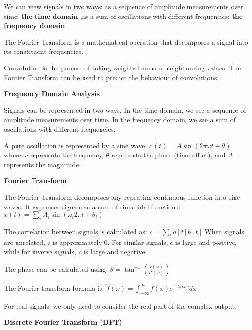 \documentclass{article}
\begin{document}
\noindent We can view signals in two ways: as a sequence of amplitude measurements over time: \textbf{the time domain}
,as a sum of oscillations with different frequencies: \textbf{the frequency domain}


\noindent The Fourier Transform is a mathematical operation that decomposes a signal into its constituent frequencies.


\noindent Convolution is the process of taking weighted sums of neighbouring values.
The Fourier Transform can be used to predict the behaviour of convolutions.



\noindent \textbf{Frequency Domain Analysis}

\noindent Signals can be represented in two ways. In the time domain, we see a sequence of amplitude measurements over time. In the frequency domain, we see a sum of oscillations with different frequencies.

\noindent A pure oscillation is represented by a sine wave:
$x(t) = A\sin(2\pi\omega t + \theta)$
where $\omega$ represents the frequency, $\theta$ represents the phase (time offset), and $A$ represents the magnitude.

\noindent \textbf{Fourier Transform}

\noindent The Fourier Transform decomposes any repeating continuous function into sine waves. It expresses signals as a sum of sinusoidal functions:
$x(t) = \sum_i A_i\sin(\omega_i 2\pi t + \theta_i)$

\noindent The correlation between signals is calculated as:
$c = \sum_t a[t]b[t]$
When signals are unrelated, $c$ is approximately 0. For similar signals, $c$ is large and positive, while for inverse signals, $c$ is large and negative.

\noindent The phase can be calculated using:
$\theta = \tan^{-1}\left(\frac{c(\omega)}{c'(\omega)}\right)$

\noindent The Fourier transform formula is:
$\hat{f}(\omega) = \int_{-\infty}^{\infty} f(x)e^{-2\pi ix\omega}dx$

\noindent For real signals, we only need to consider the real part of the complex output.

\noindent \textbf{Discrete Fourier Transform (DFT)}
\end{document}

